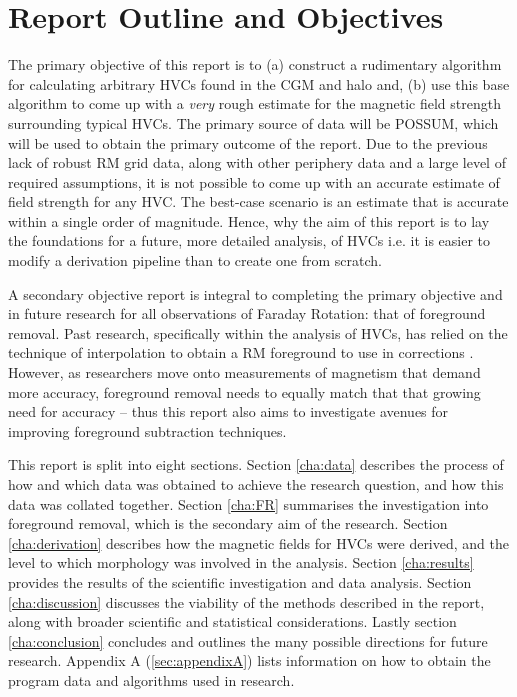 \section{Report Outline and Objectives}
\label{sec:outline}

The primary objective of this report is to (a) construct a rudimentary algorithm for calculating arbitrary HVCs found in the CGM and halo and, (b) use this base algorithm to come up with a \textit{very} rough estimate for the magnetic field strength surrounding typical HVCs. The primary source of data will be POSSUM, which will be used to obtain the primary outcome of the report. Due to the previous lack of robust RM grid data, along with other periphery data and a large level of required assumptions, it is not possible to come up with an accurate estimate of field strength for any HVC. The best-case scenario is an estimate that is accurate within a single order of magnitude. Hence, why the aim of this report is to lay the foundations for a future, more detailed analysis, of HVCs i.e. it is easier to modify a derivation pipeline than to create one from scratch.


A secondary objective report is integral to completing the primary objective and in future research for all observations of Faraday Rotation: that of foreground removal. Past research, specifically within the analysis of HVCs, has relied on the technique of interpolation to obtain a RM foreground to use in corrections \citep{ID21, ID3, ID26}. However, as researchers move onto measurements of magnetism that demand more accuracy, foreground removal needs to equally match that that growing need for accuracy – thus this report also aims to investigate avenues for improving foreground subtraction techniques.


This report is split into eight sections. Section \ref{cha:data} describes the process of how and which data was obtained to achieve the research question, and how this data was collated together. Section \ref{cha:FR} summarises the investigation into foreground removal, which is the secondary aim of the research. Section \ref{cha:derivation} describes how the magnetic fields for HVCs were derived, and the level to which morphology was involved in the analysis. Section \ref{cha:results} provides the results of the scientific investigation and data analysis. Section \ref{cha:discussion} discusses the viability of the methods described in the report, along with broader scientific and statistical considerations. Lastly section \ref{cha:conclusion} concludes and outlines the many possible directions for future research. Appendix A (\ref{sec:appendixA}) lists information on how to obtain the program data and algorithms used in research.